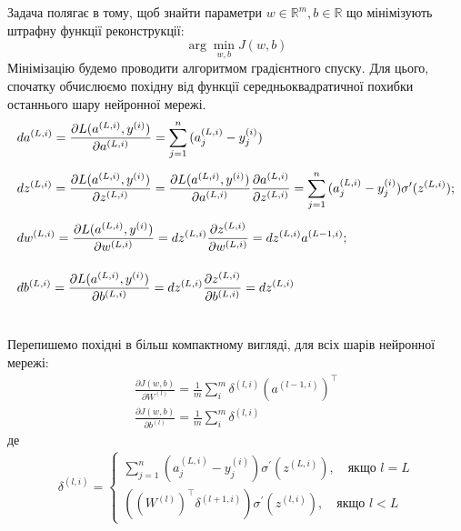 \documentclass[14pt,a4paper]{extarticle}
\newcounter{e}
\numberwithin{equation}{section}
\numberwithin{figure}{section}
\newcommand{\ith}{^{(i)}}
\begin{document}
	Задача полягає в тому, щоб знайти параметри $w \in \mathbb{R}^{m}, b\in \mathbb{R}$ що мінімізують штрафну функції реконструкції:
	\begin{equation}
		\arg \min_{w, b} J (w, b)
	\end{equation}
	Мінімізацію будемо проводити алгоритмом градієнтного спуску. Для цього, спочатку обчислюємо похідну від функції середньоквадратичної похибки останнього шару нейронної мережі.
	\begin{equation}
		\begin{array}{l}
			\displaystyle
			da^{(L, i)}
			=
			\pdv{L(a^{(L, i)}, y\ith)}{a^{(L, i)}}
			=
			\sum_{j=1}^{n}{(a^{(L, i)}_j - y\ith_j)}
			\\[0.7cm]

			\displaystyle
			dz^{(L, i)}
			=
			\pdv{L(a^{(L, i)}, y\ith)}{z^{(L, i)}}
			= 
			\pdv{L(a^{(L, i)}, y\ith)}{a^{(L, i)}} \pdv{a^{(L, i)}}{z^{(L, i)}}
			=
			\sum_{j=1}^{n}{(a^{(L, i)}_j - y\ith_j)} \sigma^{\prime}(z^{(L, i)});
			\\[0.7cm]

			\displaystyle
			dw^{(L, i)} 
			=
			\pdv{L(a^{(L, i)}, y\ith)}{w^{(L, i)}}
			=
			dz^{(L, i)} \pdv{z^{(L, i)}}{w^{(L, i)}}
			=
			dz^{(L, i)} a^{(L-1, i)};
			\\[0.7cm]
	
			\displaystyle
			db^{(L, i)}
			=
			\pdv{L(a^{(L, i)}, y\ith)}{b^{(L, i)}}
			=
			dz^{(L, i)} \pdv{z^{(L, i)}}{b^{(L, i)}} 
			= 
			dz^{(L, i)}
			\\[0.7cm]
		\end{array}
	\end{equation}

	Перепишемо похідні в більш компактному вигляді, для всіх шарів нейронної мережі:
	\begin{equation}
		\begin{array}{l}
			\displaystyle
			\frac{\partial J(w, b)}{\partial W^{(l)}} =\frac{1}{m} \sum_{i}^{m} 	\delta^{(l, i)}\left(a^{(l-1, i)}\right)^{\top}
			\\[0.7cm]
	
			\displaystyle
			 \frac{\partial J(w, b)}{\partial b^{(l)}} =\frac{1}{m} \sum_{i}^{m} \delta^{(l, i)}
		\end{array}
	\end{equation}
	де
	\begin{equation}
		\begin{array}{l}
		\displaystyle
			\delta^{(l, i)}
			=
			\left\{
			\begin{array}{l}
				\displaystyle
				\sum_{j=1}^{n}{ \left(a^{(L, i)}_j - y\ith_j\right)} \sigma^{\prime}(z^{(L, i)}), \quad \text{якщо } l = L
				\\[0.7cm]
				
				\displaystyle
				\left((W^{(l)})^{\top} \delta^{(l+1, i)} \right) \sigma^{\prime} (z^{(l, i)}), \quad \text{якщо } l < L
			\end{array}\right.
		\end{array}
	\end{equation}
\end{document}
